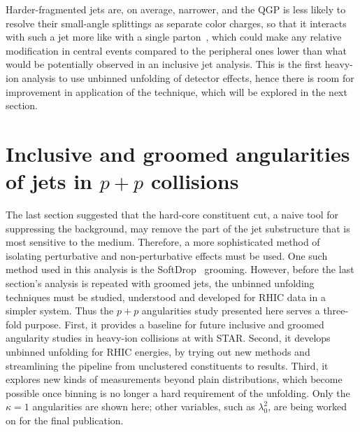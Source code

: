 %
Harder-fragmented jets are, on average, narrower, and the QGP is less likely to resolve their small-angle splittings as separate color charges, so that it interacts with such a jet more like with a single parton~\cite{Casalderrey-Solana:2012evi}, which could make any relative modification in central events compared to the peripheral ones lower than what would be potentially observed in an inclusive jet analysis. 
%
This is the first heavy-ion analysis to use unbinned unfolding of detector effects, hence there is room for improvement in application of the technique, which will be explored in the next section.

\section{Inclusive and groomed angularities of jets in \(p + p\) collisions}
\label{sec:ppAngularities}
The last section suggested that the hard-core constituent cut, a naive tool for suppressing the background, may remove the part of the jet substructure that is most sensitive to the medium.
%
Therefore, a more sophisticated method of isolating perturbative and non-perturbative effects must be used.
%
One such method used in this analysis is the SoftDrop~\cite{SoftDrop_Larkoski_2014} grooming.
%
However, before  the last section's analysis is repeated with groomed jets, the unbinned unfolding techniques must be studied, understood and developed for RHIC data in a simpler system.
%
Thus the \(p+p\) angularities study presented here serves a three-fold purpose.
%
First, it provides a baseline for future inclusive and groomed angularity studies in heavy-ion collisions at  with STAR.
%
Second, it develops unbinned unfolding for RHIC energies, by trying out new methods and streamlining the pipeline from unclustered constituents to results.
%
Third, it explores new kinds of measurements beyond plain distributions, which become possible once binning is no longer a hard requirement of the unfolding.
%
Only the \(\kappa = 1\) angularities are shown here; other variables, such as \(\lambda_0^2\), are being worked on for the final publication.

 
